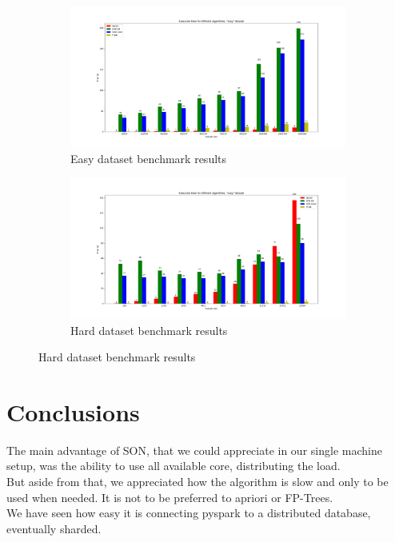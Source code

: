 \documentclass[a4paper]{article}
\begin{document}
	\begin{figure}[h]
		\centering
		\begin{subfigure}[b]{1\textwidth}
			\centering
			\includegraphics[width=\textwidth]{benchmarkeasy.png}
         	\caption{Easy dataset benchmark results}
         	\label{fig:easybenchmark}
		\end{subfigure}
		\hfill
		
		\begin{subfigure}[b]{1\textwidth}
			\centering
			\includegraphics[width=\textwidth]{benchmarkhard.png}
         	\caption{Hard dataset benchmark results}
         	\label{fig:hardbenchmark}
		\end{subfigure}
		\hfill
		
	\end{figure}

	
	\section{Conclusions}
	The main advantage of SON, that we could appreciate in our single machine setup, was the ability to use all available core, distributing the load.\\
	But aside from that, we appreciated how the algorithm is slow and only to be used when needed. It is not to be preferred to apriori or FP-Trees.\\
	We have seen how easy it is connecting pyspark to a distributed database, eventually sharded.\\
\end{document}
